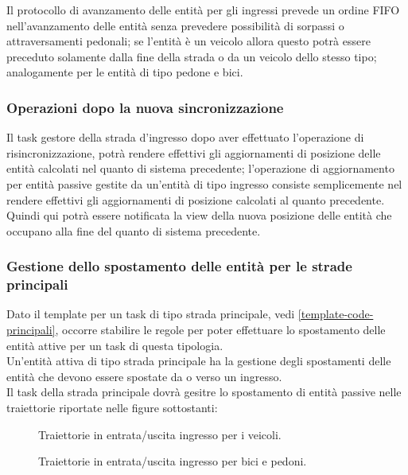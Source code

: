 Il protocollo di avanzamento delle entità per gli ingressi prevede un ordine FIFO nell'avanzamento delle entità senza prevedere possibilità di sorpassi o attraversamenti pedonali; se l'entità è un veicolo allora questo potrà essere preceduto solamente dalla fine della strada o da un veicolo dello stesso tipo; analogamente per le entità di tipo pedone e bici.
\subsubsection*{Operazioni dopo la nuova sincronizzazione} 
Il task gestore della strada d'ingresso dopo aver effettuato l'operazione di risincronizzazione, potrà rendere effettivi gli aggiornamenti di posizione delle entità calcolati nel quanto di sistema precedente; l'operazione di aggiornamento per entità passive gestite da un'entità di tipo ingresso consiste semplicemente nel rendere effettivi gli aggiornamenti di posizione calcolati al quanto precedente. Quindi qui potrà essere notificata la view della nuova posizione delle entità che occupano alla fine del quanto di sistema precedente.  
\subsubsection{Gestione dello spostamento delle entità per le strade principali}
Dato il template per un task di tipo strada principale, vedi \ref{template-code-principali}, occorre stabilire le regole per poter effettuare lo spostamento delle entità attive per un task di questa tipologia.\\
Un'entità attiva di tipo strada principale ha la gestione degli spostamenti delle entità che devono essere spostate da o verso un ingresso. \\ Il task della strada principale dovrà gesitre lo spostamento di entità passive nelle traiettorie riportate nelle figure sottostanti:

\begin{figure}[H] %
\caption{Traiettorie in entrata/uscita ingresso per i veicoli.}
\label{fig:Traiettorie in entrata/uscita ingresso per i veicoli}
\end{figure}

\begin{figure}[H] %
\caption{Traiettorie in entrata/uscita ingresso per bici e pedoni.}
\label{fig:Traiettorie in entrata/uscita ingresso per bici e pedoni}
\end{figure}


